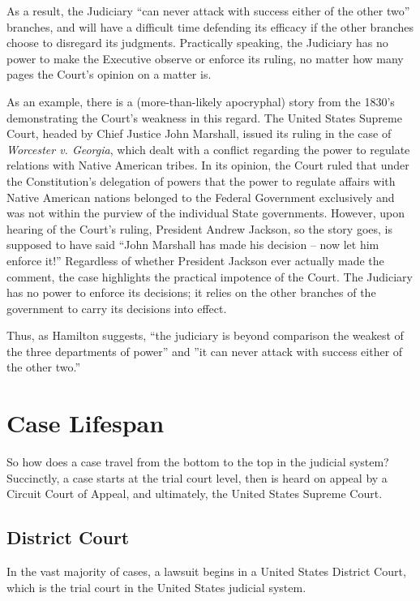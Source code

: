 As a result, the Judiciary ``can never attack with success either of the other two'' branches, and will have a difficult time defending its efficacy if the other branches choose to disregard its judgments.
Practically speaking, the Judiciary has no power to make the Executive observe or enforce its ruling, no matter how many pages the Court's opinion on a matter is.

As an example, there is a (more-than-likely apocryphal) story from the 1830's demonstrating the Court's weakness in this regard.  The United States Supreme Court, headed by Chief Justice John Marshall, issued its ruling in the case of \textit{Worcester v. Georgia}, which dealt with a conflict regarding the power to regulate relations with Native American tribes.  In its opinion, the Court ruled that under the Constitution's delegation of powers that the power to regulate affairs with Native American nations belonged to the Federal Government exclusively and was not within the purview of the individual State governments.  However, upon hearing of the Court's ruling, President Andrew Jackson, so the story goes, is supposed to have said ``John Marshall has made his decision -- now let him enforce it!''
Regardless of whether President Jackson ever actually made the comment, the case highlights the practical impotence of the Court.  The Judiciary has no power to enforce its decisions; it relies on the other branches of the government to carry its decisions into effect.

Thus, as Hamilton suggests, ``the judiciary is beyond comparison the weakest of the three departments of power'' and ''it can never attack with success either of the other two.''


\section{Case Lifespan}
So how does a case travel from the bottom to the top in the judicial system?  Succinctly, a case starts at the trial court level, then is heard on appeal by a Circuit Court of Appeal, and ultimately, the United States Supreme Court.


\subsection{District Court}
In the vast majority of cases, a lawsuit begins in a United States District Court, which is the trial court in the United States judicial system.

